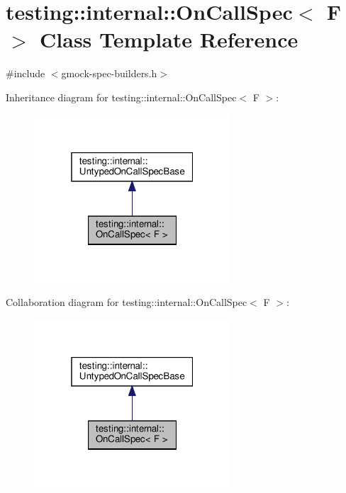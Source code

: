\hypertarget{classtesting_1_1internal_1_1_on_call_spec}{}\section{testing\+:\+:internal\+:\+:On\+Call\+Spec$<$ F $>$ Class Template Reference}
\label{classtesting_1_1internal_1_1_on_call_spec}


{\ttfamily \#include $<$gmock-\/spec-\/builders.\+h$>$}



Inheritance diagram for testing\+:\+:internal\+:\+:On\+Call\+Spec$<$ F $>$\+:
\nopagebreak
\begin{figure}[H]
\begin{center}
\leavevmode
\includegraphics[width=208pt]{classtesting_1_1internal_1_1_on_call_spec__inherit__graph}
\end{center}
\end{figure}


Collaboration diagram for testing\+:\+:internal\+:\+:On\+Call\+Spec$<$ F $>$\+:
\nopagebreak
\begin{figure}[H]
\begin{center}
\leavevmode
\includegraphics[width=208pt]{classtesting_1_1internal_1_1_on_call_spec__coll__graph}
\end{center}
\end{figure}
